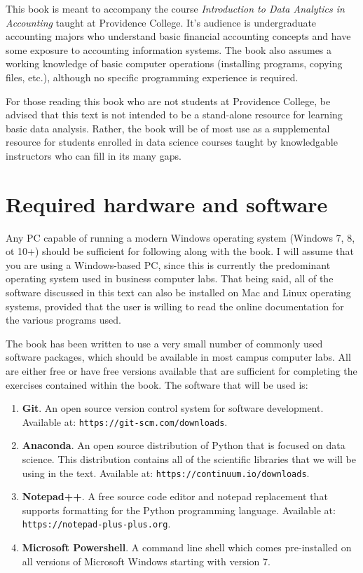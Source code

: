 \documentclass{book}
\begin{document}
This book is meant to accompany the course \textit{Introduction to Data Analytics in Accounting} taught at Providence College. It's audience is undergraduate accounting majors who understand basic financial accounting concepts and have some exposure to accounting information systems. The book also assumes a working knowledge of basic computer operations (installing programs, copying files, etc.), although no specific programming experience is required. 

For those reading this book who are not students at Providence College, be advised that this text is not intended to be a stand-alone resource for learning basic data analysis. Rather, the book will be of most use as a supplemental resource for students enrolled in data science courses taught by knowledgable instructors who can fill in its many gaps. 

\section{Required hardware and software}

Any PC capable of running a modern Windows operating system (Windows 7, 8, ot 10+) should be sufficient for following along with the book. I will assume that you are using a Windows-based PC, since this is currently the predominant operating system used in business computer labs. That being said, all of the software discussed in this text can also be installed on Mac and Linux operating systems, provided that the user is willing to read the online documentation for the various programs used.

The book has been written to use a very small number of commonly used software packages, which should be available in most campus computer labs. All are either free or have free versions available that are sufficient for completing the exercises contained within the book. The software that will be used is:

\begin{enumerate}
	\item \textbf{Git}. An open source version control system for software development. Available at: \texttt{https://git-scm.com/downloads}.
	\item \textbf{Anaconda}. An open source distribution of Python that is focused on data science. This distribution contains all of the scientific libraries that we will be using in the text. Available at: \texttt{https://continuum.io/downloads}.
	\item \textbf{Notepad++}. A free source code editor and notepad replacement that supports formatting for the Python programming language. Available at: \texttt{https://notepad-plus-plus.org}.
	\item \textbf{Microsoft Powershell}. A command line shell which comes pre-installed on all versions of Microsoft Windows starting with version 7.
\end{enumerate}
\end{document}
